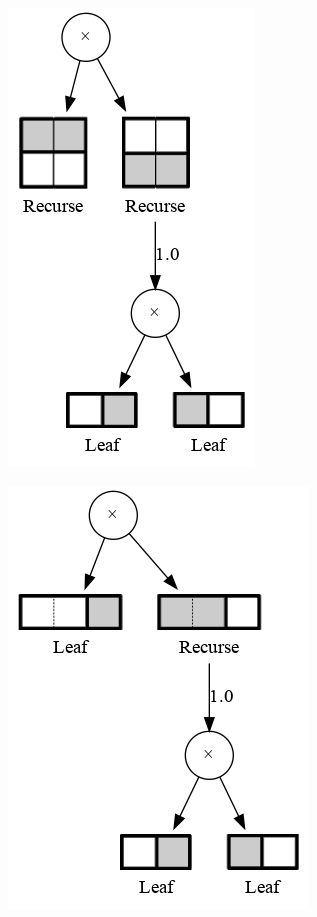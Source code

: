 \documentclass{amsart}
\theoremstyle{plain}
\numberwithin{equation}{section}
\begin{document}
\begin{figure}[h]
  \centering
  \begin{subfigure}[b]{0.3\linewidth}
    \centering\includegraphics[scale=0.3]{graphs/cc2.png}
    \caption{\label{fig:basex-1}}
  \end{subfigure}
  \begin{subfigure}[b]{0.3\linewidth}
    \centering\includegraphics[scale=0.3]{graphs/cc3.png}
    \caption{\label{fig:basex-2}}

\end{subfigure}
\end{figure}
\end{document}
